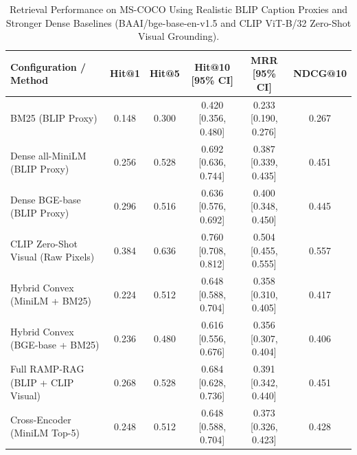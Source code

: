 \begin{table}[t]
\centering
\caption{Retrieval Performance on MS-COCO Using Realistic BLIP Caption Proxies and Stronger Dense Baselines (BAAI/bge-base-en-v1.5 and CLIP ViT-B/32 Zero-Shot Visual Grounding).}
\label{tab:coco_realistic}
\small
\begin{tabular}{l c c c c c}
\hline
\textbf{Configuration / Method} & \textbf{Hit@1} & \textbf{Hit@5} & \textbf{Hit@10 [95\% CI]} & \textbf{MRR [95\% CI]} & \textbf{NDCG@10} \\
\hline
BM25 (BLIP Proxy) & 0.148 & 0.300 & 0.420 \scriptsize{[0.356, 0.480]} & 0.233 \scriptsize{[0.190, 0.276]} & 0.267 \\
Dense all-MiniLM (BLIP Proxy) & 0.256 & 0.528 & 0.692 \scriptsize{[0.636, 0.744]} & 0.387 \scriptsize{[0.339, 0.435]} & 0.451 \\
Dense BGE-base (BLIP Proxy) & 0.296 & 0.516 & 0.636 \scriptsize{[0.576, 0.692]} & 0.400 \scriptsize{[0.348, 0.450]} & 0.445 \\
CLIP Zero-Shot Visual (Raw Pixels) & 0.384 & 0.636 & 0.760 \scriptsize{[0.708, 0.812]} & 0.504 \scriptsize{[0.455, 0.555]} & 0.557 \\
Hybrid Convex (MiniLM + BM25) & 0.224 & 0.512 & 0.648 \scriptsize{[0.588, 0.704]} & 0.358 \scriptsize{[0.310, 0.405]} & 0.417 \\
Hybrid Convex (BGE-base + BM25) & 0.236 & 0.480 & 0.616 \scriptsize{[0.556, 0.676]} & 0.356 \scriptsize{[0.307, 0.404]} & 0.406 \\
Full RAMP-RAG (BLIP + CLIP Visual) & 0.268 & 0.528 & 0.684 \scriptsize{[0.628, 0.736]} & 0.391 \scriptsize{[0.342, 0.440]} & 0.451 \\
Cross-Encoder (MiniLM Top-5) & 0.248 & 0.512 & 0.648 \scriptsize{[0.588, 0.704]} & 0.373 \scriptsize{[0.326, 0.423]} & 0.428 \\
\hline
\end{tabular}
\end{table}
